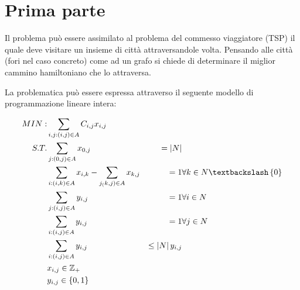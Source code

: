 %
%
\section{Prima parte}
\label{pt1:problem}
Il problema può essere assimilato al problema del commesso viaggiatore (TSP) il quale deve visitare un insieme di città attraversandole  volta. Pensando alle città (fori nel caso concreto) come ad un grafo si chiede di determinare il miglior cammino hamiltoniano che lo attraversa.

La problematica può essere espressa attraverso il seguente modello di programmazione lineare intera:

\begin{align}
MIN: &\sum_{i,j:(i,j) \in A} C_{i,j}x_{i,j}                       &  \nonumber           & \nonumber \\
S.T. &\sum_{j:(0,j) \in A} x_{0,j}                                & = \left | N \right | & \nonumber \\
     &\sum_{i:(i,k) \in A} x_{i,k} - \sum_{j_(k,j) \in A} x_{k,j} & = 1                  & \forall k \in N \textbackslash \left \{ 0 \right \} \\     
     &\sum_{j:(i,j) \in A} y_{i,j}                                & = 1                  & \forall i \in N \\     
     &\sum_{i:(i,j) \in A} y_{i,j}                                & = 1                  & \forall j \in N \\
     &\sum_{i:(i,j) \in A} y_{i,j}                                & \le \left | N \right |y_{i,j} \\
     &x_{i,j} \in \mathbb{Z}_{+}                                  & \nonumber            & \nonumber \\
     &y_{i,j} \in \left \{ 0, 1 \right \}                         & \nonumber            & \nonumber \\
\end{align}